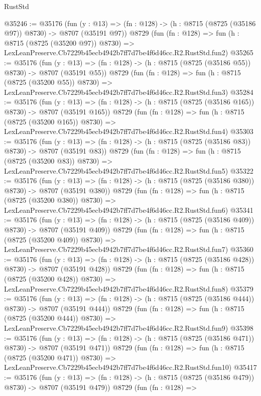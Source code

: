 \begin{lexlean}{RustStd}
\begin{coremodule}
@35246 := @35176
    (fun (y : @13) => (fn : @128) -> (h : @8715 (@8725 (@35186 @97)) @8730) -> @8707 (@35191 @97))
    @8729
    (fun (fn : @128) =>
    fun (h : @8715 (@8725 (@35200 @97)) @8730) =>
    LexLeanPreserve.Cb7229b45ecb4942b7ff7d7be4f6d46cc.R2.RustStd.fun2)
@35265 := @35176
    (fun (y : @13) => (fn : @128) -> (h : @8715 (@8725 (@35186 @55)) @8730) -> @8707 (@35191 @55))
    @8729
    (fun (fn : @128) =>
    fun (h : @8715 (@8725 (@35200 @55)) @8730) =>
    LexLeanPreserve.Cb7229b45ecb4942b7ff7d7be4f6d46cc.R2.RustStd.fun3)
@35284 := @35176
    (fun (y : @13) => (fn : @128) -> (h : @8715 (@8725 (@35186 @165)) @8730) -> @8707 (@35191 @165))
    @8729
    (fun (fn : @128) =>
    fun (h : @8715 (@8725 (@35200 @165)) @8730) =>
    LexLeanPreserve.Cb7229b45ecb4942b7ff7d7be4f6d46cc.R2.RustStd.fun4)
@35303 := @35176
    (fun (y : @13) => (fn : @128) -> (h : @8715 (@8725 (@35186 @83)) @8730) -> @8707 (@35191 @83))
    @8729
    (fun (fn : @128) =>
    fun (h : @8715 (@8725 (@35200 @83)) @8730) =>
    LexLeanPreserve.Cb7229b45ecb4942b7ff7d7be4f6d46cc.R2.RustStd.fun5)
@35322 := @35176
    (fun (y : @13) => (fn : @128) -> (h : @8715 (@8725 (@35186 @380)) @8730) -> @8707 (@35191 @380))
    @8729
    (fun (fn : @128) =>
    fun (h : @8715 (@8725 (@35200 @380)) @8730) =>
    LexLeanPreserve.Cb7229b45ecb4942b7ff7d7be4f6d46cc.R2.RustStd.fun6)
@35341 := @35176
    (fun (y : @13) => (fn : @128) -> (h : @8715 (@8725 (@35186 @409)) @8730) -> @8707 (@35191 @409))
    @8729
    (fun (fn : @128) =>
    fun (h : @8715 (@8725 (@35200 @409)) @8730) =>
    LexLeanPreserve.Cb7229b45ecb4942b7ff7d7be4f6d46cc.R2.RustStd.fun7)
@35360 := @35176
    (fun (y : @13) => (fn : @128) -> (h : @8715 (@8725 (@35186 @428)) @8730) -> @8707 (@35191 @428))
    @8729
    (fun (fn : @128) =>
    fun (h : @8715 (@8725 (@35200 @428)) @8730) =>
    LexLeanPreserve.Cb7229b45ecb4942b7ff7d7be4f6d46cc.R2.RustStd.fun8)
@35379 := @35176
    (fun (y : @13) => (fn : @128) -> (h : @8715 (@8725 (@35186 @444)) @8730) -> @8707 (@35191 @444))
    @8729
    (fun (fn : @128) =>
    fun (h : @8715 (@8725 (@35200 @444)) @8730) =>
    LexLeanPreserve.Cb7229b45ecb4942b7ff7d7be4f6d46cc.R2.RustStd.fun9)
@35398 := @35176
    (fun (y : @13) => (fn : @128) -> (h : @8715 (@8725 (@35186 @471)) @8730) -> @8707 (@35191 @471))
    @8729
    (fun (fn : @128) =>
    fun (h : @8715 (@8725 (@35200 @471)) @8730) =>
    LexLeanPreserve.Cb7229b45ecb4942b7ff7d7be4f6d46cc.R2.RustStd.fun10)
@35417 := @35176
    (fun (y : @13) => (fn : @128) -> (h : @8715 (@8725 (@35186 @479)) @8730) -> @8707 (@35191 @479))
    @8729
    (fun (fn : @128) =>

\end{coremodule}
\end{lexlean}
